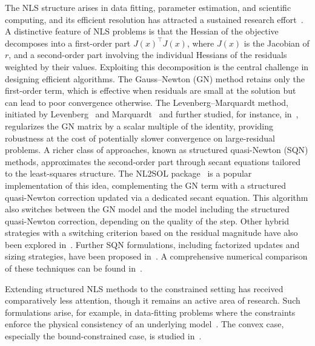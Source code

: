 \documentclass{article}
\numberwithin{equation}{section}
\theoremstyle{plain}
\begin{document}
The NLS structure arises in data fitting, parameter estimation, and scientific computing, and its efficient resolution has attracted a sustained research effort~\cite{dennisschnabel:1996,nocedalwright:2006,bjork:2024}. 
A distinctive feature of NLS problems is that the Hessian of the objective decomposes into a first-order part $J(x)^\top J(x)$, where $J(x)$ is the Jacobian of $r$, and a second-order part involving the individual Hessians of the residuals weighted by their values. Exploiting this decomposition is the central challenge in designing
efficient algorithms.
The Gauss--Newton (GN) method retains only the first-order term, which is effective when residuals are small at the solution but can lead to poor convergence otherwise.
The Levenberg--Marquardt method, initiated by Levenberg~\cite{levenberg:1944} and Marquardt~\cite{marquardt:1963} and further studied, for instance, in~\cite{bellavia-etal:2018, bergou-etal:2021}, regularizes the GN matrix by a scalar multiple of the identity, providing robustness at the cost of potentially slower convergence on large-residual problems.
A richer class of approaches, known as structured quasi-Newton (SQN) methods, approximates the second-order part through secant equations tailored to the least-squares structure. The NL2SOL package~\cite{dennisetal:1981,dennis-etal:1989} is a popular implementation of this idea, complementing the GN term with a structured quasi-Newton correction updated via a dedicated secant equation. This algorithm also switches between the GN model and the model including the structured quasi-Newton correction, depending on the quality of the step. Other hybrid strategies with a switching criterion based on the residual magnitude have also been explored in~\cite{albaalifletcher:1985, fletcherxu:1987, zhouchen:2010}. Further SQN formulations, including factorized updates and sizing strategies, have been proposed in~\cite{biggs:1977, betts:1976, huschens1994, yabetakahashi:1991, zhang-etal:2000}. A comprehensive numerical comparison of these techniques can be found in~\cite{lucksan-etal:2019}.

	Extending structured NLS methods to the constrained setting has received comparatively less attention, though it remains an active area of research. Such formulations arise, for example, in data-fitting problems where the constraints enforce the physical consistency of an underlying model~\cite{grenieretal:2006, delbos-etal2006, pu-etal:2015}. The convex case, especially the bound-constrained case, is studied in~\cite{bellavia-etal:2004, bellavia-etal:2011, porcelli:2013, goncalvesmenezes:2020}.
\end{document}
